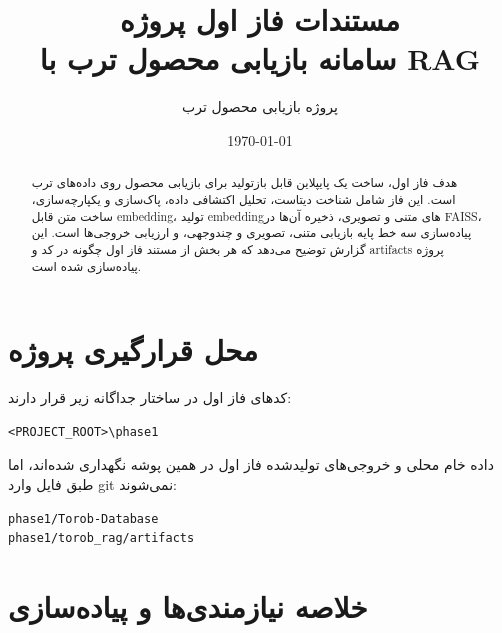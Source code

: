\documentclass[12pt,a4paper]{article}
\title{مستندات فاز اول پروژه\\
سامانه بازیابی محصول ترب با RAG}
\author{پروژه بازیابی محصول ترب}
\date{\today}
\newcommand{\code}[1]{\lr{\texttt{#1}}}
\begin{document}
\maketitle

\begin{abstract}
هدف فاز اول، ساخت یک پایپلاین قابل بازتولید برای بازیابی محصول روی داده‌های ترب است. این فاز شامل شناخت دیتاست، تحلیل اکتشافی داده، پاک‌سازی و یکپارچه‌سازی، ساخت متن قابل embedding، تولید embeddingهای متنی و تصویری، ذخیره آن‌ها در FAISS، پیاده‌سازی سه خط پایه بازیابی متنی، تصویری و چندوجهی، و ارزیابی خروجی‌ها است. این گزارش توضیح می‌دهد که هر بخش از مستند فاز اول چگونه در کد و artifacts پروژه پیاده‌سازی شده است.
\end{abstract}

\tableofcontents
\newpage

\section{محل قرارگیری پروژه}

کدهای فاز اول در ساختار جداگانه زیر قرار دارند:

\begin{latin}
\begin{lstlisting}
<PROJECT_ROOT>\phase1
\end{lstlisting}
\end{latin}

داده خام محلی و خروجی‌های تولیدشده فاز اول در همین پوشه نگهداری شده‌اند، اما طبق فایل \code{.gitignore} وارد git نمی‌شوند:

\begin{latin}
\begin{lstlisting}
phase1/Torob-Database
phase1/torob_rag/artifacts
\end{lstlisting}
\end{latin}

\section{خلاصه نیازمندی‌ها و پیاده‌سازی}
\end{document}

